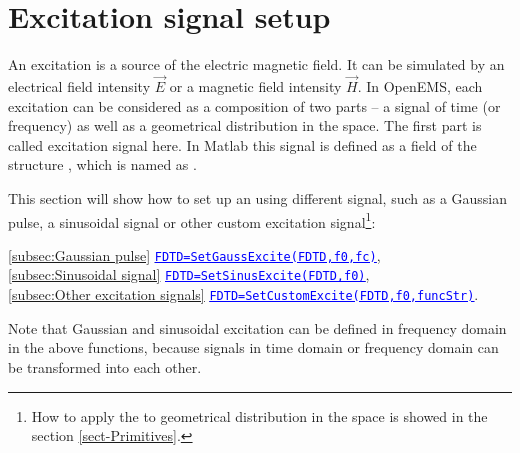 \section{Excitation signal setup} \label{sec:FDTD_Excitation}
An excitation  is a source of the  electric magnetic field. It can be  simulated by an electrical field intensity $\vec{E}$ or a magnetic field intensity $\vec{H}$. In OpenEMS, each excitation can be considered as a composition  of two parts -- a signal of  time (or  frequency) as well as  a geometrical distribution  in the space. The first part is called excitation signal here.
In Matlab this signal is defined as a field of the structure , which is named as .  \label{para:Excitation}%

This section will show how to set up  an  using different signal, such as a Gaussian pulse, a sinusoidal signal or other custom excitation signal\footnote{How to apply the   to geometrical distribution in the space  is showed in the section \ref{sect-Primitives}.}:
       \begin{myindentpar}
	     \ref{subsec:Gaussian pulse} \hspace{1cm} \hyperref[subsec:Gaussian pulse]{\textcolor{blue}{\underline{\texttt{FDTD=SetGaussExcite(FDTD,f0,fc)}}}}, \\
	      \ref{subsec:Sinusoidal signal} \hspace{1cm} \hyperref[subsec:Sinusoidal signal]{\textcolor{blue}{\underline{\texttt{FDTD=SetSinusExcite(FDTD,f0)}}}},\\
	      \ref{subsec:Other excitation signals} \hspace{1cm} \hyperref[subsec:Other excitation signals]{\textcolor{blue}{\underline{\texttt{FDTD=SetCustomExcite(FDTD,f0,funcStr)}}}}.
       \end{myindentpar}
Note that Gaussian and sinusoidal excitation can be  defined in frequency domain in the above functions, because signals in time domain or frequency domain can be transformed into each other.\\
